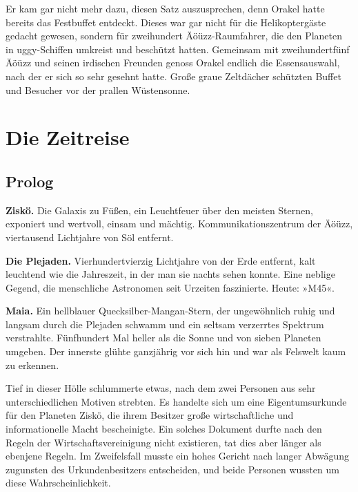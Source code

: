 Er kam gar nicht mehr dazu, diesen Satz auszusprechen, denn Orakel hatte bereits das Festbuffet entdeckt. Dieses war gar nicht für die Helikoptergäste gedacht gewesen, sondern für zweihundert Äöüzz-Raumfahrer, die den Planeten in uggy-Schiffen umkreist und beschützt hatten. Gemeinsam mit zweihundertfünf Äöüzz und seinen irdischen Freunden genoss Orakel endlich die Essensauswahl, nach der er sich so sehr gesehnt hatte. Große graue Zeltdächer schützten Buffet und Besucher vor der prallen Wüstensonne.

\cleardoubleevenpage




\part{Die Zeitreise}

\chapter{Prolog}

\textbf{Ziskö.} Die Galaxis zu Füßen, ein Leuchtfeuer über den meisten Sternen, exponiert und wertvoll, einsam und mächtig. Kommunikationszentrum der Äöüzz, viertausend Lichtjahre von Söl entfernt.

\textbf{Die Plejaden.} Vierhundertvierzig Lichtjahre von der Erde entfernt, kalt leuchtend wie die Jahreszeit, in der man sie nachts sehen konnte. Eine neblige Gegend, die menschliche Astronomen seit Urzeiten faszinierte. Heute: »M45«.

\textbf{Maia.} Ein hellblauer Quecksilber-Mangan-Stern, der ungewöhnlich ruhig und langsam durch die Plejaden schwamm und ein seltsam verzerrtes Spektrum verstrahlte. Fünfhundert Mal heller als die Sonne und von sieben Planeten umgeben. Der innerste glühte ganzjährig vor sich hin und war als Felswelt kaum zu erkennen.

Tief in dieser Hölle schlummerte etwas, nach dem zwei Personen aus sehr unterschiedlichen Motiven strebten. Es handelte sich um eine Eigentumsurkunde für den Planeten Ziskö, die ihrem Besitzer große wirtschaftliche und informationelle Macht bescheinigte. Ein solches Dokument durfte nach den Regeln der Wirtschaftsvereinigung nicht existieren, tat dies aber länger als ebenjene Regeln. Im Zweifelsfall musste ein hohes Gericht nach langer Abwägung zugunsten des Urkundenbesitzers entscheiden, und beide Personen wussten um diese Wahrscheinlichkeit.

